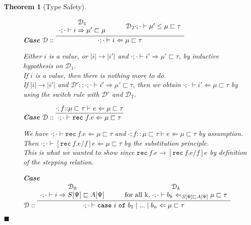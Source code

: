 \documentclass[letterpaper, 11pt]{article}
\newtheorem*{theorem}{Theorem}[section]
\newenvironment*{proof}{\par\noindent{\normalfont{\bf{Proof. \\ \hphantom{mm}
}}}}{\hfill \small$\blacksquare$\\[-4pt]}
\newcommand{\D}{\mathcal{D}}
\newcommand{\Rar}{\Rightarrow}
\newcommand{\Lar}{\Leftarrow}
\newcommand{\rar}{\rightarrow}
\newcommand{\rec}{\texttt{rec}}
\newcommand{\case}{\texttt{case}}
\newcommand{\of}{\texttt{of}}
\begin{document}
\begin{theorem}[Type Safety]
\begin{proof}
\begin{enumerate}
            \begin{description}
              \item[] \textbf{Case} $\D :: \infer{\cdot ; \cdot \vdash i \Lar \mu \sqsubset \tau}
                {
                  \begin{array}{c}
                    \D_1 \\
                    \cdot ; \cdot \vdash i \Rar \mu' \sqsubset \mu
                  \end{array}
                  &&
                  \begin{array}{c}
                    \D_2
                    \cdot ; \cdot \vdash \mu' \leq \mu \sqsubset \tau
                  \end{array}
                }$
                
                Either $i$ is a value, or $|i| \rar |i'|$ and $\cdot; \cdot \vdash i' \Rar \mu' \sqsubset \tau$, by inductive hypothesis on $\D_1$. \\
                If $i$ is a value, then there is nothing more to do. \\
                If $|i| \rar |i'|$ and $\D' :: \cdot; \cdot \vdash i' \Rar \mu' \sqsubset \tau$, then we obtain $\cdot ; \cdot \vdash i' \Lar \mu \sqsubset \tau$ 
                by using the switch rule with $\D'$ and $\D_2$. \\

              \item[] \textbf{Case} $\D :: \infer{\cdot; \cdot \vdash \rec \ f.e \Lar \mu \sqsubset \tau}
                {\cdot; f {::}\mu \sqsubset \tau \vdash e \Lar \mu \sqsubset \tau}$

                We have $\cdot; \cdot \vdash \rec \ f.e \Lar \mu \sqsubset \tau$ and $\cdot; f {::} \mu \sqsubset \tau \vdash e \Lar \mu \sqsubset \tau$ 
                by assumption. \\
                Then $\cdot; \cdot \vdash [\rec \ f.e / f] e \Lar \mu \sqsubset \tau$ by the substitution principle. \\
                This is what we wanted to show since $\rec \ f.e \rar [\rec \ f.e / f] e$ by definition of the stepping relation. \\

              \item[] \textbf{Case} $ \D :: \infer{\cdot ; \cdot \vdash \case \ i \ \of \ b_1 \mid ... \mid b_n \Lar \mu \sqsubset \tau}
                {
                  \begin{array}{c}
                    \D_0 \\
                    \cdot ; \cdot \vdash i \Rar S[\Psi] \sqsubset A[\Psi]
                  \end{array}
                  &&
                  \begin{array}{c}
                    \D_k \\
                    \text{for all k, } \cdot ; \cdot \vdash b_k \Lar_{S[\Psi] \sqsubset A[\Psi]} \mu \sqsubset \tau
                  \end{array}
                }$


\end{description}
\end{enumerate}
\end{proof}
\end{theorem}
\end{document}
